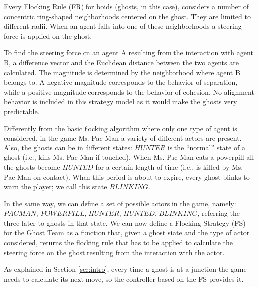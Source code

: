 \documentclass[a4paper]{llncs}
\begin{document}
Every Flocking Rule (FR) for boids (ghosts, in this case), considers a number of concentric ring-shaped neighborhoods centered on the ghost. They are limited to different radii. When an agent falls into one of these neighborhoods a steering force is applied on the ghost.

To find the steering force on an agent A resulting from the interaction with agent B, a difference vector and the Euclidean distance between the two agents are calculated.
The magnitude is determined by the neighborhood where agent B belongs to.
A negative magnitude corresponds to the behavior of separation, while a positive magnitude corresponds to the behavior of cohesion. No alignment behavior is included in this strategy model as it would make the ghosts very predictable.

Differently from the basic flocking algorithm where only one type of agent is considered, in the game Ms. Pac-Man a variety of different actors are present. Also, the ghosts can be in different states: $HUNTER$ is the ``normal'' state of a ghost (i.e., kills Ms. Pac-Man if touched).  When Ms. Pac-Man eats a powerpill all the ghosts become $HUNTED$ for a certain length of time (i.e., is killed by Ms. Pac-Man on contact). When this period is about to expire, every ghost blinks to warn the player; we call this state $BLINKING$. 

In the same way, we can define a set of possible actors in the game, namely:
$PACMAN$, $POWERPILL$, $HUNTER$, $HUNTED$, $BLINKING$, referring the three later to ghosts in that state. We can now define a Flocking Strategy (FS) for the Ghost Team as a function that, given a ghost state and the type of actor considered, returns the flocking rule that has to be applied to calculate the steering force on the ghost resulting from the interaction with the actor.

As explained in Section \ref{sec:intro}, every time a ghost is at a junction the game needs to calculate its next move, so the controller based on the FS provides it.
\end{document}

